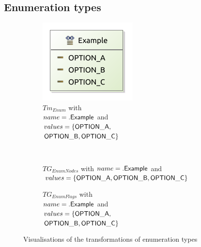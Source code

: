 \subsection{Enumeration types}
\label{subsec:library_of_transformations:type_level_transformations:enumeration_types}

\begin{figure}[H]
    \centering
    \begin{subfigure}{0.25\textwidth}
        \centering
        \includegraphics{images/05_library_of_transformations/02_type_level_transformations/04_enumeration_types/enum_type.pdf}
        \caption{$Tm_{Enum}$ with \\$name = .\mathsf{Example}$ and \\$values = \{ \mathsf{OPTION\_A},$\\$ \mathsf{OPTION\_B}, \mathsf{OPTION\_C} \}$}
        \label{fig:library_of_transformations:type_level_transformations:enumeration_types:visualisation:ecore}
    \end{subfigure}
    \\
    \begin{subfigure}{0.65\textwidth}
        \centering
        
        \caption{$TG_{EnumNodes}$ with $name = .\mathsf{Example}$ and\\$values = \{ \mathsf{OPTION\_A}, \mathsf{OPTION\_B}, \mathsf{OPTION\_C} \}$}
        \label{fig:library_of_transformations:type_level_transformations:enumeration_types:visualisation:groove_nodes}
    \end{subfigure}
    \begin{subfigure}{0.25\textwidth}
        \centering
        
        \caption{$TG_{EnumFlags}$ with \\$name = .\mathsf{Example}$ and \\$values = \{ \mathsf{OPTION\_A},$\\$ \mathsf{OPTION\_B}, \mathsf{OPTION\_C} \}$}
        \label{fig:library_of_transformations:type_level_transformations:enumeration_types:visualisation:groove_flags}
    \end{subfigure}
    \caption{Visualisations of the transformations of enumeration types}
    \label{fig:library_of_transformations:type_level_transformations:enumeration_types:visualisation}
\end{figure}

